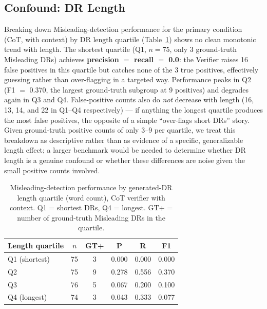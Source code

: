 \documentclass[runningheads]{llncs}
\begin{document}
\subsection{Confound: DR Length}
Breaking down Misleading-detection performance for the primary condition (CoT, with context) by DR length quartile (Table~\ref{tab:length-quartile}) shows no clean monotonic trend with length. The shortest quartile (Q1, $n=75$, only 3 ground-truth Misleading DRs) achieves \textbf{precision $=$ recall $=$ 0.0}: the Verifier raises 16 false positives in this quartile but catches none of the 3 true positives, effectively guessing rather than over-flagging in a targeted way. Performance peaks in Q2 (F1 $=$ 0.370, the largest ground-truth subgroup at 9 positives) and degrades again in Q3 and Q4. False-positive counts also do \emph{not} decrease with length (16, 13, 14, and 22 in Q1--Q4 respectively) --- if anything the longest quartile produces the most false positives, the opposite of a simple ``over-flags short DRs'' story. Given ground-truth positive counts of only 3--9 per quartile, we treat this breakdown as descriptive rather than as evidence of a specific, generalizable length effect; a larger benchmark would be needed to determine whether DR length is a genuine confound or whether these differences are noise given the small positive counts involved.

\begin{table}[t]
\centering
\caption{Misleading-detection performance by generated-DR length quartile (word count), CoT verifier with context. Q1 = shortest DRs, Q4 = longest. GT+ = number of ground-truth Misleading DRs in the quartile.}
\label{tab:length-quartile}
\begin{tabular}{lccccc}
\toprule
Length quartile & $n$ & GT+ & P & R & F1 \\
\midrule
Q1 (shortest) & 75 & 3 & 0.000 & 0.000 & 0.000 \\
Q2            & 75 & 9 & 0.278 & 0.556 & 0.370 \\
Q3            & 76 & 5 & 0.067 & 0.200 & 0.100 \\
Q4 (longest)  & 74 & 3 & 0.043 & 0.333 & 0.077 \\
\bottomrule
\end{tabular}
\end{table}
\end{document}
